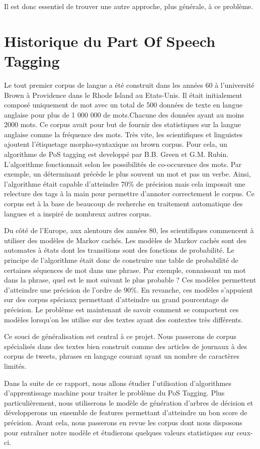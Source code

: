 \documentclass[french, 14pt]{memoir}
\begin{document}
Il est donc essentiel de trouver une autre approche, plus générale, à ce problème.

\section{Historique du Part Of Speech Tagging}

Le tout premier corpus de langue a été construit dans les années 60 à l'université Brown à Providence dans le Rhode Island au Etats-Unis. Il était initialement composé uniquement de mot avec un total de 500 données de texte en langue anglaise pour plus de 1 000 000 de mots.Chacune des données ayant au moins 2000 mots. Ce corpus avait pour but de fournir des statistiques sur la langue anglaise comme la fréquence des mots. 
Très vite, les scientifiques et linguistes ajoutent l'étiquetage morpho-syntaxique au brown corpus. Pour cela, un algorithme de PoS tagging est developpé par B.B. Green et G.M. Rubin. L'algorithme fonctionnait selon les possibilités de co-occurence des mots. Par exemple, un déterminant précède le plus souvent un mot et pas un verbe. Ainsi, l'algorithme était capable d'atteindre 70\% 
de précision mais cela imposait une relecture des tags à la main pour permettre d'annoter correctement le corpus. Ce corpus est à la base de beaucoup de recherche en traitement automatique des langues et a inspiré de nombreux autres corpus. 

Du côté de l'Europe, aux alentours des années 80, les scientifiques commencent à utiliser des modèles de Markov cachés. Les modèles de Markov cachés sont des automates à états dont les transitions sont des fonctions de probabilité. Le principe de l'algorithme était donc de construire une table de probabilité de certaines séquences de mot dans une phrase. Par exemple, connaissant un mot dans la phrase, quel est le mot suivant le plus probable ? Ces modèles permettent d'atteindre une précision de l'ordre de 90\%. En revanche, ces modèles s'appuient sur des corpus spéciaux permettant d'atteindre un grand pourcentage de précision. Le problème est maintenant de savoir comment se comportent ces modèles lorsqu'on les utilise sur des textes ayant des contextes très différents.

Ce souci de généralisation est central à ce projet. Nous passerons de corpus spécialisés dans des textes bien construit comme des articles de journaux à des corpus de tweets, phrases en langage courant ayant un nombre de caractères limités. 

Dans la suite de ce rapport, nous allons étudier l'utilisation d'algorithmes d'apprentissage machine pour traiter le problème du PoS Tagging. Plus particulièrement, nous utiliserons le modèle de génération d'arbres de décision et développerons un ensemble de features permettant d'atteindre un bon score de précision. 
Avant cela, nous passerons en revue les corpus dont nous disposons pour entraîner notre modèle et étudierons quelques valeurs statistiques sur ceux-ci. 
\end{document}
